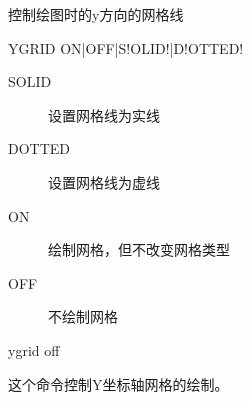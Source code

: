\label{cmd:ygrid}

控制绘图时的y方向的网格线

\begin{SACSTX}
YGRID ON|OFF|S!OLID!|D!OTTED!
\end{SACSTX}

\begin{description}
\item [SOLID] 设置网格线为实线
\item [DOTTED] 设置网格线为虚线
\item [ON] 绘制网格，但不改变网格类型
\item [OFF] 不绘制网格
\end{description}

\begin{SACDFT}
ygrid off
\end{SACDFT}

这个命令控制Y坐标轴网格的绘制。

